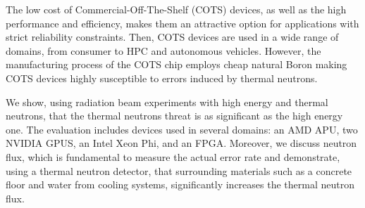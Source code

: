 The low cost of Commercial-Off-The-Shelf (COTS) devices, as well as the high performance and efficiency, makes them an attractive option for applications with strict reliability constraints. Then, COTS devices are used in a wide range of domains, from consumer to HPC and autonomous vehicles. However, the manufacturing process of the COTS chip employs cheap natural Boron making COTS devices highly susceptible to errors induced by thermal neutrons.

We show, using radiation beam experiments with high energy and thermal neutrons, that the thermal neutrons threat is as significant as the high energy one. The evaluation includes devices used in several domains: an AMD APU, two NVIDIA GPUS, an Intel Xeon Phi, and an FPGA. Moreover, we discuss neutron flux, which is fundamental to measure the actual error rate and demonstrate, using a thermal neutron detector, that surrounding materials such as a concrete floor and water from cooling systems, significantly increases the thermal neutron flux.


